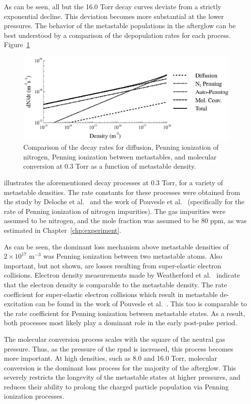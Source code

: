 As can be seen, all but the 16.0 Torr decay curves deviate from a strictly
exponential decline. This deviation becomes more substantial at the lower
pressures. The behavior of the metastable populations in the afterglow can be
best understood by a comparison of the depopulation rates for each process.
Figure~\ref{fig:decay}
\begin{figure}
  \centering
  \includegraphics{./chapters/metastables/figures/decay.eps}
  \caption{Comparison of the decay rates for diffusion, Penning ionization of
    nitrogen, Penning ionization between metastables, and molecular conversion at
    0.3 Torr as a function of metastable density.}
  \label{fig:decay}
\end{figure}
illustrates the aforementioned decay processes at 0.3 Torr, for a variety of
metastable densities. The rate constants for these processes were obtained from
the study by Deloche et al.~\cite{Deloche1976} and the work of Pouvesle et
al.~\cite{Pouvesle1988} (specifically for the rate of Penning ionization of
nitrogen impurities). The gas impurities were assumed to be nitrogen, and the
mole fraction was assumed to be 80 ppm, as was estimated in
Chapter~\ref{chp:experiment}.

As can be seen, the dominant loss mechanism above metastable densities of
$2\times10^{17}$ m$^{-3}$ was Penning ionization between two metastable atoms.
Also important, but not shown, are losses resulting from super-elastic electron
collisions. Electron density measurements made by Weatherford et
al.~\cite{Weatherford2012} indicate that the electron density is comparable to
the metastable density. The rate coefficient for super-elastic electron
collisions which result in metastable de-excitation can be found in the work of
Pouvesle et al.~\cite{Pouvesle1988}. This too is comparable to the rate
coefficient for Penning ionization between metastable states. As a result, both
processes most likely play a dominant role in the early post-pulse period.

The molecular conversion process scales with the square of the neutral gas
pressure. Thus, as the pressure of the \acs{rpnd} is increased, this process
becomes more important. At high densities, such as 8.0 and 16.0 Torr, molecular
conversion is the dominant loss process for the majority of the afterglow. This
severely restricts the longevity of the metastable states at higher pressures,
and reduces their ability to prolong the charged particle population via Penning
ionization processes.

